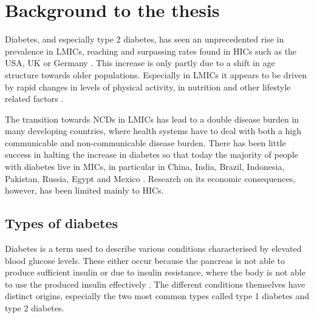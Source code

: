 
\section{Background to the thesis}

Diabetes, and especially type 2 diabetes, has seen an unprecedented rise in prevalence in \acp{LMIC}, reaching and surpassing rates found in \acp{HIC} such as the USA, UK or Germany \parencite{Risk2016,Hu2011}. This increase is only partly due to a shift in age structure towards older populations. Especially in \acp{LMIC} it appears to be driven by rapid changes in levels of physical activity, in nutrition and other lifestyle related factors  \parencite{Risk2016,Hu2011}.

The transition towards \acp{NCD} in \acp{LMIC} has lead to a double disease burden in many developing countries, where health systems have to deal with both a high communicable and non-communicable disease burden. There has been little success in halting the increase in diabetes so that today the majority of people with diabetes live in \acp{MIC}, in particular in China, India, Brazil, Indonesia, Pakistan, Russia, Egypt and Mexico \parencite{Risk2016}. Research on its economic consequences, however, has been limited mainly to \acp{HIC}.

 
\subsection{Types of diabetes}

Diabetes is a term used to describe various conditions characterised by elevated blood glucose levels. These either occur because the pancreas is not able to produce sufficient insulin or due to insulin resistance, where the body is not able to use the produced insulin effectively \parencite{WorldHealthOrganization2016}. The different conditions themselves have distinct origins, especially the two most common types called type 1 diabetes and type 2 diabetes. 

